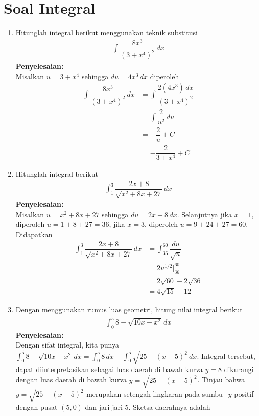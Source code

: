 \documentclass{article}
\begin{document}
\section*{Soal Integral}
\begin{enumerate}
	\item Hitunglah integral berikut menggunakan teknik substitusi 
	\begin{align*}
	\int \dfrac{8x^3}{(3+x^4)^2}\, dx
	\end{align*}
	\textbf{Penyelesaian:}\\
	Misalkan $u=3+x^4$ sehingga $du=4x^3\, dx$ diperoleh 
	\begin{align*}
	\int \dfrac{8x^3}{(3+x^4)^2}\, dx &= \int \dfrac{2(4x^3) \, dx}{(3+x^4)^2}\\
	&= \int \dfrac{2}{u^2}\, du\\
	&= -\dfrac{2}{u}+C\\
	&= -\dfrac{2}{3+x^4}+C
	\end{align*}
	\item Hitunglah integral berikut 
	\begin{align*}
	\int_1^3 \dfrac{2x+8}{\sqrt{x^2+8x+27}}\, dx
	\end{align*}
	\textbf{Penyelesaian:}\\
	Misalkan $u=x^2+8x+27$ sehingga $du = 2x+8\, dx$. Selanjutnya jika $x=1$, diperoleh $u=1+8+27=36$, jika $x=3$, diperoleh $u=9+24+27=60$. Didapatkan
	\begin{align*}
	\int_1^3 \dfrac{2x+8}{\sqrt{x^2+8x+27}}\, dx &= \int_{36}^{60} \dfrac{du}{\sqrt{u}}\\
	&= 2u^{1/2}\bigg|^{60}_{36} \\
	&= 2\sqrt{60}-2\sqrt{36}\\
	&= 4\sqrt{15}-12
	\end{align*}
	\item Dengan menggunakan rumus luas geometri, hitung nilai integral berikut
	\begin{align*}
	\int_{0}^{5} 8-\sqrt{10x-x^2}\, dx
	\end{align*}
	\textbf{Penyelesaian:}\\
	Dengan sifat integral, kita punya $\displaystyle \int_0^5 8-\sqrt{10x-x^2} \, dx = \int_0^5 8 \, dx- \int_0^5 \sqrt{25-(x-5)^2} \, dx$. Integral tersebut, dapat diinterpretasikan sebagai luas daerah di bawah kurva $y=8$ dikurangi dengan luas daerah di bawah kurva $y=\sqrt{25-(x-5)^2}$. Tinjau bahwa $y=\sqrt{25-(x-5)^2}$ merupakan setengah lingkaran pada sumbu$-y$ positif dengan pusat $(5,0)$ dan jari-jari 5. Sketsa daerahnya adalah 

\end{enumerate}
\end{document}
